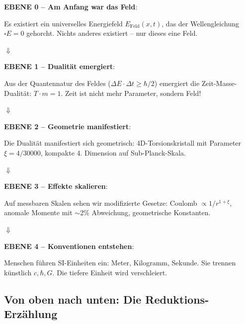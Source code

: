 \begin{revolutionary}
\textbf{EBENE 0 -- Am Anfang war das Feld}:

Es existiert ein universelles Energiefeld $E_{\text{Feld}}(x,t)$, das der Wellengleichung $\square E = 0$ gehorcht. Nichts anderes existiert -- nur dieses eine Feld.

\vspace{0.3cm}

$\Downarrow$

\vspace{0.3cm}

\textbf{EBENE 1 -- Dualität emergiert}:

Aus der Quantennatur des Feldes ($\Delta E \cdot \Delta t \geq \hbar/2$) emergiert die Zeit-Masse-Dualität: $T \cdot m = 1$. Zeit ist nicht mehr Parameter, sondern Feld!

\vspace{0.3cm}

$\Downarrow$

\vspace{0.3cm}

\textbf{EBENE 2 -- Geometrie manifestiert}:

Die Dualität manifestiert sich geometrisch: 4D-Torsionskristall mit Parameter $\xi = 4/30000$, kompakte 4. Dimension auf Sub-Planck-Skala.

\vspace{0.3cm}

$\Downarrow$

\vspace{0.3cm}

\textbf{EBENE 3 -- Effekte skalieren}:

Auf messbaren Skalen sehen wir modifizierte Gesetze: Coulomb $\propto 1/r^{1+\xi}$, anomale Momente mit $\sim$2\% Abweichung, geometrische Konstanten.

\vspace{0.3cm}

$\Downarrow$

\vspace{0.3cm}

\textbf{EBENE 4 -- Konventionen entstehen}:

Menschen führen SI-Einheiten ein: Meter, Kilogramm, Sekunde. Sie trennen künstlich $c, \hbar, G$. Die tiefere Einheit wird verschleiert.
\end{revolutionary}

\subsection{Von oben nach unten: Die Reduktions-Erzählung}

